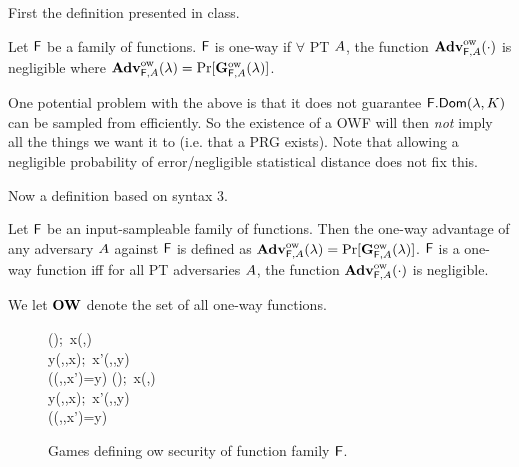 

First the definition presented in class.
\begin{defn}
	Let $\mathsf{F}$ be a family of functions. $\mathsf{F}$ is one-way if $\forall$ PT $A$, the function $\mathbf{Adv}^{\rm ow}_{\mathsf{F},A}(\cdot)$ is negligible where $\mathbf{Adv}^{\rm ow}_{\mathsf{F},A}(\lambda)=\Pr[\mathbf{G}^{\rm ow}_{\mathsf{F},A}(\lambda)]$.
\end{defn}

One potential problem with the above is that it does not guarantee $\mathsf{F}.\mathsf{Dom}(\lambda,K)$ can be sampled from efficiently.
So the existence of a OWF will then \emph{not} imply all the things we want it to (i.e. that a PRG exists).
Note that allowing a negligible probability of error/negligible statistical distance does not fix this.

Now a definition based on syntax 3.

\begin{defn}
	Let $\mathsf{F}$ be an input-sampleable family of functions. Then the one-way advantage of any adversary $A$ against $\mathsf{F}$ is defined as $\mathbf{Adv}^{\rm ow}_{\mathsf{F},A}(\lambda)=\Pr[\mathbf{G}^{\rm ow}_{\mathsf{F},A}(\lambda)]$. $\mathsf{F}$ is a one-way function iff for all PT adversaries $A$, the function $\mathbf{Adv}^{\rm ow}_{\mathsf{F},A}(\cdot)$ is negligible.
\end{defn}

We let $\mathbf{OW}$ denote the set of all one-way functions.

\begin{figure} [t]
\fbox
{
  {
    \key\getsr\Keys{\FF}(\secParam);\ 
    x\getsr\Dom{\FF}(\secParam,\key)\\
    y\gets \Ev{\FF}(\secIn,\key,x);\ 
    x'\getsr\advA(\secIn,\key,y)\\
    \pcreturn (\Ev{\FF}(\secIn,\key,x')=y)
  }
}
\fbox
{
  {
    \key\getsr\Kg{\FF}(\secIn);\ 
    x\getsr\Is{\FF}(\secIn,\key)\\
    y\gets \Ev{\FF}(\secIn,\key,x);\ 
    x'\getsr\advA(\secIn,\key,y)\\
    \pcreturn (\Ev{\FF}(\secIn,\key,x')=y)
  }
}
\vspace{-2ex}
\caption{Games defining ow security of function family $\mathsf{F}$.}
\label{fig-ff-ow}
\hrulefill
\end{figure}

